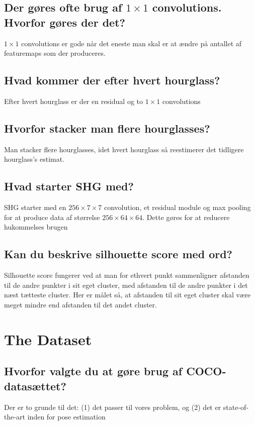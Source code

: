 \documentclass[a4paper]{article}
\begin{document}
\subsection{Der gøres ofte brug af $1 \times 1$ convolutions. Hvorfor gøres der det?}
$1 \times 1$ convolutions er gode når det eneste man skal er at ændre på antallet af featuremaps som der produceres.

\subsection{Hvad kommer der efter hvert hourglass?}
Efter hvert hourglass er der en residual og to $1 \times 1$ convolutions

\subsection{Hvorfor stacker man flere hourglasses?}
Man stacker flere hourglasses, idet hvert hourglass så reestimerer det tidligere hourglass's estimat.

\subsection{Hvad starter SHG med?}
SHG starter med en $256 \times 7 \times 7$ convolution, et residual module og max pooling for at produce data af størrelse $256 \times 64 \times 64$. Dette gøres for at reducere hukommelses brugen

\subsection{Kan du beskrive silhouette score med ord?}
Silhouette score fungerer ved at man for ethvert punkt sammenligner afstanden til de andre punkter i sit eget cluster, med afstanden til de andre punkter i det næst tætteste cluster. Her er målet så, at afstanden til sit eget cluster skal være meget mindre end afstanden til det andet cluster.

\section{The Dataset}

\subsection{Hvorfor valgte du at gøre brug af COCO-datasættet?}
Der er to grunde til det: (1) det passer til vores problem, og (2) det er state-of-the-art inden for pose estimation
\end{document}
